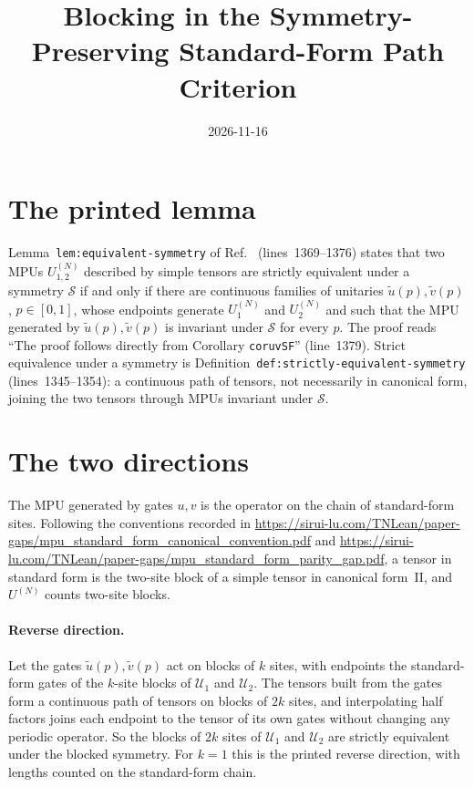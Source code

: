 \documentclass{article}
\title{Blocking in the Symmetry-Preserving Standard-Form Path Criterion}
\author{}
\date{2026-11-16}
\begin{document}
\maketitle
{}

\section{The printed lemma}

Lemma~\texttt{lem:equivalent-symmetry} of Ref.~\cite{Cirac2017MPU}
(lines~1369--1376) states that two MPUs $U_{1,2}^{(N)}$ described by simple
tensors are strictly equivalent under a symmetry $\mathcal S$ if and only if
there are continuous families of unitaries $\tilde u(p),\tilde v(p)$,
$p\in[0,1]$, whose endpoints generate $U_1^{(N)}$ and $U_2^{(N)}$ and such that
the MPU generated by $\tilde u(p),\tilde v(p)$ is invariant under $\mathcal S$
for every $p$. The proof reads ``The proof follows directly from Corollary
\texttt{coruvSF}'' (line~1379). Strict equivalence under a symmetry is
Definition~\texttt{def:strictly-equivalent-symmetry} (lines~1345--1354): a
continuous path of tensors, not necessarily in canonical form, joining the two
tensors through MPUs invariant under $\mathcal S$.

\section{The two directions}

The MPU generated by gates $u,v$ is the operator on the chain of standard-form
sites. Following the conventions recorded in
\url{https://sirui-lu.com/TNLean/paper-gaps/mpu_standard_form_canonical_convention.pdf}
and
\url{https://sirui-lu.com/TNLean/paper-gaps/mpu_standard_form_parity_gap.pdf},
a tensor in standard form is the two-site block of a simple tensor in
canonical form~II, and $U^{(N)}$ counts two-site blocks.

\paragraph{Reverse direction.} Let the gates $\tilde u(p),\tilde v(p)$ act on
blocks of $k$ sites, with endpoints the standard-form gates of the $k$-site
blocks of $\mathcal U_1$ and $\mathcal U_2$. The tensors built from the gates
form a continuous path of tensors on blocks of $2k$ sites, and interpolating
half factors joins each endpoint to the tensor of its own gates without
changing any periodic operator. So the blocks of $2k$ sites of
$\mathcal U_1$ and $\mathcal U_2$ are strictly equivalent under the blocked
symmetry. For $k=1$ this is the printed reverse direction, with lengths
counted on the standard-form chain.
\end{document}
